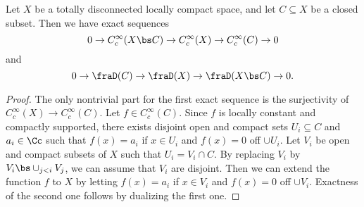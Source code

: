 \begin{proposition}
Let $X$ be a totally disconnected locally compact space, and let $C\subseteq X$ be a closed subset. Then we have exact sequences
$$
0 \to C_{c}^{\infty}(X\bs C) \to C_{c}^{\infty}(X) \to C_{c}^{\infty}(C) \to 0
$$
and 
$$
0 \to \fraD(C) \to \fraD(X) \to \fraD(X\bs C) \to 0. 
$$
\end{proposition}
\begin{proof}
The only nontrivial part for the first exact sequence is the surjectivity of $C_{c}^{\infty}(X) \to C_{c}^{\infty}(C)$. Let $f\in C_{c}^{\infty}(C)$. Since $f$ is locally constant and compactly supported, there exists disjoint open and compact sets $U_{i} \subseteq C$ and $a_{i}\in \Cc$ such that $f(x) = a_i$ if $x\in U_i$ and $f(x) = 0$ off $\cup U_i$. 
Let $V_i$ be open and compact subsets of $X$ such that $U_i = V_i \cap C$. By replacing $V_i$ by $V_i \bs \cup_{j<i} V_j$, we can assume that $V_i$ are disjoint. Then we can extend the function $f$ to $X$ by letting $f(x) = a_i$ if $x\in V_i$ and $f(x) = 0$ off $\cup V_i$. 
Exactness of the second one follows by dualizing the first one. 
\end{proof}



